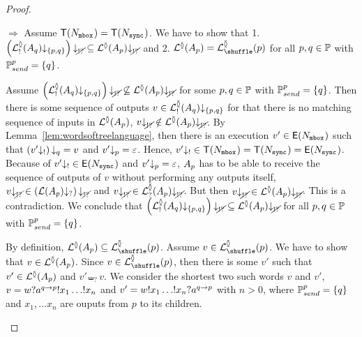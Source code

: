 \documentclass[submission,copyright,creativecommons,UKenglish]{eptcs}
\begin{document}
\begin{proof}
	\begin{compactdesc}
		\item[$ \Rightarrow $] Assume $ \mathsf{T}(N_{{\mathtt{mbox}}^{}}) = \mathsf{T}(N_{{\mathtt{sync}}^{}}) $.
			We have to show that 1. $ \left( \mathcal{L}_{!}^{\between}{\left( A_{q} \right)}{\downarrow_{{\left\lbrace p, q \right\rbrace}}} \right){\downarrow_{\cancel{!?}}} \subseteq \mathcal{L}^{\between}{\left( A_{p} \right)}{\downarrow_{\cancel{!?}}} $ and 2. $ \LangTree{\Automaton{p}} = \LangShuffle{p} $ for all $ p, q \in \mathbb{P} $ with $ \mathbb{P}_{send}^{p} = {\left\lbrace q \right\rbrace} $.
			\begin{compactenum}
				\item Assume $ \left( \mathcal{L}_{!}^{\between}{\left( A_{q} \right)}{\downarrow_{{\left\lbrace p, q \right\rbrace}}} \right){\downarrow_{\cancel{!?}}} \not\subseteq \mathcal{L}^{\between}{\left( A_{p} \right)}{\downarrow_{\cancel{!?}}} $ for some $ p, q \in \mathbb{P} $ with $ \mathbb{P}_{send}^{p} = {\left\lbrace q \right\rbrace} $.
					Then there is some sequence of outputs $ v \in \mathcal{L}_{!}^{\between}{\left( A_{q} \right)}{\downarrow_{{\left\lbrace p, q \right\rbrace}}} $ for that there is no matching sequence of inputs in $ \mathcal{L}^{\between}{\left( A_{p} \right)} $, \ie $ v{\downarrow_{\cancel{!?}}} \notin \mathcal{L}^{\between}{\left( A_{p} \right)}{\downarrow_{\cancel{!?}}} $.
					By Lemma~\ref{lem:wordsoftreelanguage}, then there is an execution $ v' \in \mathsf{E}(N_{{\mathtt{mbox}}^{}}) $ such that $ \left( v'{\downarrow_{!}} \right){\downarrow_{q}} = v $ and $ v'{\downarrow_{p}} = \varepsilon $.
					Hence, $ v'{\downarrow_{!}} \in \mathsf{T}(N_{{\mathtt{mbox}}^{ }}) = \mathsf{T}(N_{{\mathtt{sync}}^{}}) = \mathsf{E}(N_{{\mathtt{sync}}^{}}) $.
					Because of $ v'{\downarrow_{!}} \in \mathsf{E}(N_{{\mathtt{sync}}^{}}) $ and $ v'{\downarrow_{p}} = \varepsilon $, $ A_{p} $ has to be able to receive the sequence of outputs of $ v $ without performing any outputs itself, \ie $ v{\downarrow_{\cancel{!?}}} \in \left( \mathcal{L}{\left(A_{p}\right)}{\downarrow_{?}} \right){\downarrow_{\cancel{!?}}} $ and $ v{\downarrow_{\cancel{!?}}} \in \mathcal{L}_{?}^{\between}{\left( A_{p} \right)}{\downarrow_{\cancel{!?}}} $.
					But then $ v{\downarrow_{\cancel{!?}}} \in \mathcal{L}^{\between}{\left( A_{p} \right)}{\downarrow_{\cancel{!?}}} $.
					This is a contradiction.
					We conclude that $ \left( \mathcal{L}_{!}^{\between}{\left( A_{q} \right)}{\downarrow_{{\left\lbrace p, q \right\rbrace}}} \right){\downarrow_{\cancel{!?}}} \subseteq \mathcal{L}^{\between}{\left( A_{p} \right)}{\downarrow_{\cancel{!?}}} $ for all $ p, q \in \mathbb{P} $ with $ \mathbb{P}_{send}^{p} = {\left\lbrace q \right\rbrace} $.
				\item By definition, $ \LangTree{\Automaton{p}} \subseteq \LangShuffle{p} $.
					Assume $ v \in \LangShuffle{p} $.
					We have to show that $ v \in \mathcal{L}^{\between}{\left( A_{p} \right)} $.
					Since $ v \in \LangShuffle{p} $, then there is some $ v' $ such that $ v' \in \mathcal{L}^{\between}{\left( A_{p} \right)} $ and $ v' \shuffle_{?} v $.
					We consider the shortest two such words $ v $ and $ v' $, \ie $ v = w ?a^{q \rightarrow p} !x_1 \ldots !x_n $ and $ v' = w !x_1 \ldots !x_n ?a^{q \rightarrow p} $ with $ n > 0 $, where $ \mathbb{P}_{send}^{p} = {\left\lbrace q \right\rbrace} $ and $ x_1, \ldots x_n $ are ouputs from $ p $ to its children.

\end{compactenum}
\end{compactdesc}
\end{proof}
\end{document}
